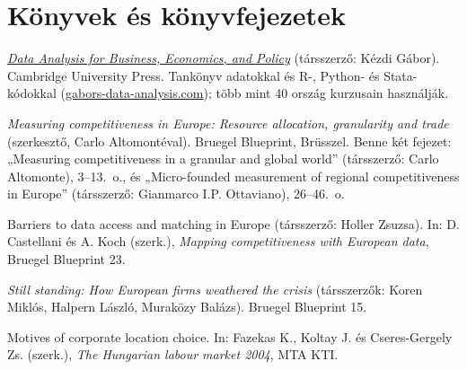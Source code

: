 \documentclass[10pt,a4paper]{article}
\begin{document}
\section{Könyvek és könyvfejezetek}
\begin{cvlist}
  \item[2021] \href{https://gabors-data-analysis.com}{\textit{Data Analysis for Business, Economics, and Policy}} (társszerző: Kézdi Gábor). Cambridge University Press. Tankönyv adatokkal és R-, Python- és Stata-kódokkal (\href{https://gabors-data-analysis.com}{gabors-data-analysis.com}); több mint 40 ország kurzusain használják.
  \item[2016] \textit{Measuring competitiveness in Europe: Resource allocation, granularity and trade} (szerkesztő, Carlo Altomontéval). Bruegel Blueprint, Brüsszel. Benne két fejezet: „Measuring competitiveness in a granular and global world” (társszerző: Carlo Altomonte), 3--13.~o., és „Micro-founded measurement of regional competitiveness in Europe” (társszerző: Gianmarco I.P. Ottaviano), 26--46.~o.
  \item[2015] Barriers to data access and matching in Europe (társszerző: Holler Zsuzsa). In: D. Castellani és A. Koch (szerk.), \textit{Mapping competitiveness with European data}, Bruegel Blueprint 23.
  \item[2011] \textit{Still standing: How European firms weathered the crisis} (társszerzők: Koren Miklós, Halpern László, Muraközy Balázs). Bruegel Blueprint 15.
  \item[2004] Motives of corporate location choice. In: Fazekas K., Koltay J. és Cseres-Gergely Zs. (szerk.), \textit{The Hungarian labour market 2004}, MTA KTI.
\end{cvlist}

\end{document}
